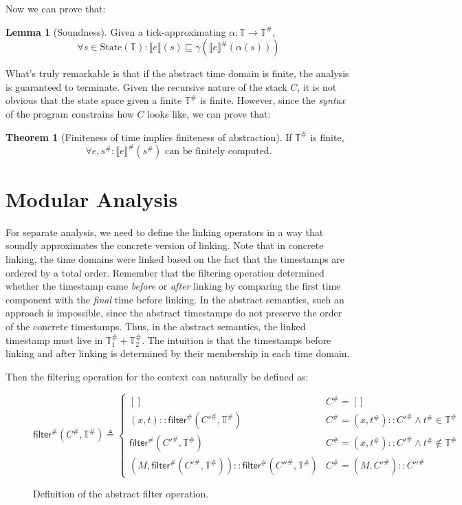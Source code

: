 \documentclass[acmsmall,review]{acmart}\settopmatter{printfolios=true,printccs=false,printacmref=false}
\theoremstyle{definition}
\newtheorem{lem}{Lemma}[section]
\newtheorem{thm}{Theorem}[section]
\newcommand*{\cons}{::}
\newcommand*{\A}[1]{{#1}^{\#}}
\newcommand*{\Time}{\mathbb{T}}
\newcommand*{\ATime}{\A{\Time}}
\newcommand*{\State}[1]{\text{State}({#1})}
\newcommand*{\sembracket}[1]{\lBrack{#1}\rBrack}
\newcommand*{\filter}{\mathsf{filter}}
\begin{document}
Now we can prove that:
\begin{lem}[Soundness]
  Given a tick-approximating $\alpha:\Time\rightarrow\ATime$,
  \[
    \forall s\in\State{\Time}:\sembracket{e}(s)\sqsubseteq\gamma(\A{\sembracket{e}}(\alpha(s)))
  \]
\end{lem}

What's truly remarkable is that if the abstract time domain is finite, the analysis is guaranteed to terminate.
Given the recursive nature of the stack $C$, it is not obvious that the state space given a finite $\ATime$ is finite.
However, since the \emph{syntax} of the program constrains how $C$ looks like, we can prove that:

\begin{thm}[Finiteness of time implies finiteness of abstraction]
  If $\ATime$ is finite,
  \[
    \forall e,\A{s}: \A{\sembracket{e}}(\A{s})\text{ can be finitely computed.}
  \]
\end{thm}

\section{Modular Analysis}

For separate analysis, we need to define the linking operators in a way that soundly approximates the concrete version of linking.
Note that in concrete linking, the time domains were linked based on the fact that the timestamps are ordered by a total order.
Remember that the filtering operation determined whether the timestamp came \emph{before} or \emph{after} linking by comparing the first time component with the \emph{final} time before linking.
In the abstract semantics, such an approach is impossible, since the abstract timestamps do not preserve the order of the concrete timestamps.
Thus, in the abstract semantics, the linked timestamp must live in $\ATime_1+\ATime_2$.
The intuition is that the timestamps before linking and after linking is determined by their membership in each time domain.

Then the filtering operation for the context can naturally be defined as:
\begin{figure}[h!]
  \footnotesize
  \[
    \A\filter(\A{C},\ATime)\triangleq
    \begin{cases}
      []                                                         & \A{C}=[]                                             \\
      (x,t)\cons\A\filter(\A{C'},\ATime)                         & \A{C}=(x,\A{t})\cons \A{C'}\wedge \A{t}\in\ATime     \\
      \A\filter(\A{C'},\ATime)                                   & \A{C}=(x,\A{t})\cons \A{C'}\wedge \A{t}\not\in\ATime \\
      (M,\A\filter(\A{C'},\ATime))\cons\A\filter(\A{C''},\ATime) & \A{C}=(M, \A{C'})\cons \A{C''}
    \end{cases}
  \]
  \caption{Definition of the abstract filter operation.}
\end{figure}
\end{document}
